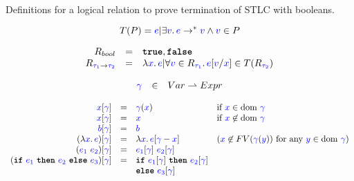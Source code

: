 \documentclass{article}
\newcommand{\meta}[1]{{\color{blue}#1}}
\newcommand{\stlc}{\textsc{STLC}}
\newcommand{\dom}[1]{\ensuremath{\text{dom}\ #1}}
\newcommand{\progtext}[1]{\ensuremath{\text{\ttfamily\bfseries #1}}}
\newcommand{\progif}{\progtext{if}}
\newcommand{\progthen}{\progtext{then}}
\newcommand{\progelse}{\progtext{else}}
\newcommand{\progtrue}{\progtext{true}}
\newcommand{\progfalse}{\progtext{false}}
\begin{document}
  \clearpage
  \noindent Definitions for a logical relation to prove termination of \stlc{} with booleans.

  \vspace{3mm}

  \noindent{}

  \[
    T(P) = \set{\meta{e} | \exists\meta{v}.\, \meta{e}\to^*\meta{v} \wedge \meta{v} \in P}
  \]

  \noindent\boxed{R_{\meta{\tau}}}
  \[
    \begin{array}{rcl}
      R_{bool} & = & \set{\progtrue,\progfalse}\\
      R_{\meta{\tau_1}\to\meta{\tau_2}} & = & \set{\lambda\meta{x}.\,\meta{e} | \forall \meta{v}\in R_{\meta{\tau_1}}.\, \meta{e}[\meta{v}/\meta{x}] \in T(R_{\meta{\tau_2}})}
    \end{array}
  \]

  \vspace{3mm}  

  \[
    \begin{array}{rcl}
      \meta{\gamma} & \in & Var \rightharpoonup Expr
    \end{array}
  \]

  \vspace{3mm}

  \noindent\boxed{\meta{e}[\meta{\gamma}]}
  \[
    \begin{array}{rcll}
      \meta{x}[\meta{\gamma}] & = & \meta{\gamma}(\meta{x}) &\text{if $\meta{x}\in\dom{\meta{\gamma}}$}\\
      \meta{x}[\meta{\gamma}] & = & \meta{x} &\text{if $\meta{x}\not\in\dom{\meta{\gamma}}$}\\
      \meta{b}[\meta{\gamma}] & = & \meta{b} &\\
      (\lambda\meta{x}.\, \meta{e})[\meta{\gamma}] & = & \lambda\meta{x}.\, \meta{e}[\meta{\gamma} - \meta{x}] & (\meta{x} \not\in FV(\meta{\gamma}(\meta{y}))\text{ for any }\meta{y}\in\dom{\meta{\gamma}})\\
      (\meta{e_1}\ \meta{e_2})[\meta{\gamma}] & = & \meta{e_1}[\meta{\gamma}]\ \meta{e_2}[\meta{\gamma}]&\\

      (\progif\ \meta{e_1}\ \progthen\ \meta{e_2}\ \progelse\ \meta{e_3})[\meta{\gamma}] & = & \progif\ \meta{e_1}[\meta{\gamma}]\ \progthen\ \meta{e_2}[\meta{\gamma}]\\
      & & \progelse\ \meta{e_3}[\meta{\gamma}] &
    \end{array}
  \]
\end{document}
